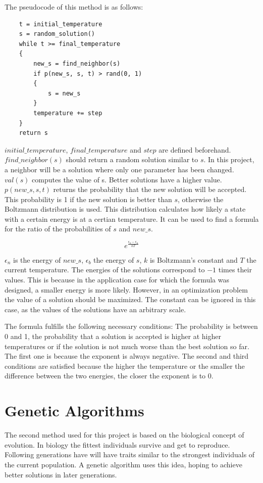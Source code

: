 \documentclass[10pt]{scrreprt}
\begin{document}
The pseudocode of this method is as follows:
\lstset {language=C++}
\begin{lstlisting}
    t = initial_temperature
    s = random_solution()
    while t >= final_temperature 
    {   
        new_s = find_neighbor(s)
        if p(new_s, s, t) > rand(0, 1)
        {
            s = new_s
        }
        temperature += step
    }
    return s
\end{lstlisting}


$initial\_temperature$, $final\_temperature$ and $step$ are defined beforehand. $find\_neighbor(s)$ should return a random solution similar to $s$. In this project, a neighbor will be a solution where only one parameter has been changed. $val(s)$ computes the value of s. Better solutions have a higher value. $p(new\_s, s, t)$ returns the probability that the new solution will be accepted. This probability is 1 if the new solution is better than $s$, otherwise the Boltzmann distribution is used. \cite{SA1} This distribution calculates how likely a state with a certain energy is at a certian temperature. It can be used to find a formula for the ratio of the probabilities of $s$ and $new\_s$.

{\Large
\begin{equation}
    e^{
    \frac{
        \epsilon_{b} - \epsilon_{n}
    }{
        kT
    }
    }
\end{equation}
}

$\epsilon_n$ is the energy of $new\_s$, $\epsilon_b$ the energy of $s$, $k$ is Boltzmann's constant and $T$ the current temperature. The energies of the solutions correspond to $-1$ times their values. This is because in the application case for which the formula was designed, a smaller energy is more likely. However, in an optimization problem the value of a solution should be maximized. The constant can be ignored in this case, as the values of the solutions have an arbitrary scale.

The formula fulfills the following necessary conditions: The probability is between 0 and 1, the probability that a solution is accepted is higher at higher temperatures or if the solution is not much worse than the best solution so far. The first one is because the exponent is always negative. The second and third conditions are satisfied because the higher the temperature or the smaller the difference between the two energies, the closer the exponent is to 0.

\section{Genetic Algorithms}
The second method used for this project is based on the biological concept of evolution. In biology the fittest individuals survive and get to reproduce. Following generations have will have traits similar to the strongest individuals of the current population. A genetic algorithm uses this idea, hoping to achieve better solutions in later generations.
\end{document}

